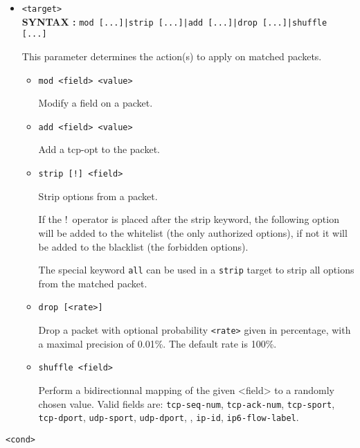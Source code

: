 \documentclass[a4paper,twoside,11pt]{report}
\makeatletter
\renewcommand{\subsection}{\@startsection{subsection}{2}{0mm}
  {\baselineskip}%
  {\baselineskip}{\Large\color{black}}}%
\makeatother
\begin{document}
\begin{itemize}
\item \texttt{<target>}  \\
   \textbf{SYNTAX :} \texttt{mod [...]|strip [...]|add [...]|drop [...]|shuffle [...]} 

   This parameter determines the action(s) to apply on matched packets. 
   \begin{itemize}
   \item \texttt{mod <field> <value>} 

      Modify a field on a packet. 
   \item \texttt{add <field> <value>} 

      Add a tcp-opt to the packet.

   \item \texttt{strip [!]\ <field>} 

      Strip options from a packet. 

   If the !\ operator is placed after the strip keyword, the following option
   will be added to the whitelist (the only authorized options), if not it
   will be added to the blacklist (the forbidden options). 

   The special keyword \texttt{all} can be used in a \texttt{strip} target
   to strip all options from the matched packet.
   \item \texttt{drop [<rate>]} 

      Drop a packet with optional probability \texttt{<rate>} given in percentage,
      with a maximal precision of 0.01\%. The default rate is 100\%.

   \item \texttt{shuffle <field>}
      
      Perform a bidirectionnal mapping of the given <field> to a randomly chosen value.
      Valid fields are: \texttt{tcp-seq-num}, \texttt{tcp-ack-num}, \texttt{tcp-sport},
      \texttt{tcp-dport}, \texttt{udp-sport}, \texttt{udp-dport}, , \texttt{ip-id},
      \texttt{ip6-flow-label}.
      
   \end{itemize}

\end{itemize}

\subsection{\texttt{<cond>}}
\end{document}
